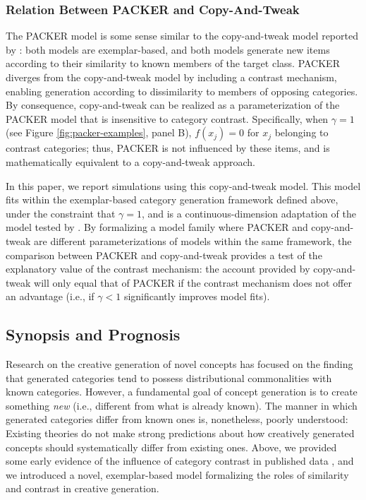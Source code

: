 \documentclass[12pt]{article}
\begin{document}
\begin{flushleft}
\subsubsection{Relation Between PACKER and Copy-And-Tweak}
\label{section:copytweak-packer}
The PACKER model is some sense similar to the copy-and-tweak model reported by \cite{jern2013probabilistic}: both models are exemplar-based, and both models generate new items according to their similarity to known members of the target class. PACKER diverges from the copy-and-tweak model by including a contrast mechanism, enabling generation according to dissimilarity to members of opposing categories. By consequence, copy-and-tweak can be realized as a parameterization of the PACKER model that is insensitive to category contrast. Specifically, when $\gamma = 1$ (see Figure \ref{fig:packer-examples}, panel B), $f(x_j) = 0$ for $x_j$ belonging to contrast categories; thus, PACKER is not influenced by these items, and is mathematically equivalent to a copy-and-tweak approach. 

In this paper, we report simulations using this copy-and-tweak model. This model fits within the exemplar-based category generation framework defined above, under the constraint that $\gamma = 1$, and is a continuous-dimension adaptation of the model tested by \cite{jern2013probabilistic}. By formalizing a model family where PACKER and copy-and-tweak are different parameterizations of models within the same framework, the comparison between PACKER and copy-and-tweak provides a test of the explanatory value of the contrast mechanism: the account provided by copy-and-tweak will only equal that of PACKER if the contrast mechanism does not offer an advantage (i.e., if $\gamma < 1$ significantly improves model fits).


\subsection{Synopsis and Prognosis}

Research on the creative generation of novel concepts has focused on the finding that generated categories tend to possess distributional commonalities with known categories. However, a fundamental goal of concept generation is to create something \textit{new} (i.e., different from what is already known). The manner in which generated categories differ from known ones is, nonetheless, poorly understood: Existing theories do not make strong predictions about how creatively generated concepts should systematically differ from existing ones. Above, we provided some early evidence of the influence of category contrast in published data \citep[][Experiment 3]{jern2013probabilistic}, and we introduced a novel, exemplar-based model formalizing the roles of similarity and contrast in creative generation.


\end{flushleft}
\end{document}

